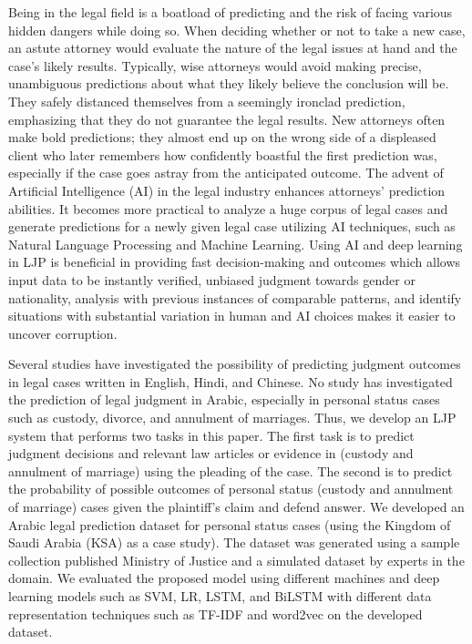 \documentclass[sn-mathphys,Numbered]{sn-jnl}%
\theoremstyle{thmstyleone}%
\theoremstyle{thmstyletwo}%
\theoremstyle{thmstylethree}%
\begin{document}
Being in the legal field is a boatload of predicting and the risk of facing various hidden dangers while doing so. When deciding whether or not to take a new case, an astute attorney would evaluate the nature of the legal issues at hand and the case's likely results. Typically, wise attorneys would avoid making precise, unambiguous predictions about what they likely believe the conclusion will be. They safely distanced themselves from a seemingly ironclad prediction, emphasizing that they do not guarantee the legal results. New attorneys often make bold predictions; they almost end up on the wrong side of a displeased client who later remembers how confidently boastful the first prediction was, especially if the case goes astray from the anticipated outcome. The advent of Artificial Intelligence (AI) in the legal industry enhances attorneys' prediction abilities. It becomes more practical to analyze a huge corpus of legal cases and generate predictions for a newly given legal case utilizing AI techniques, such as Natural Language Processing and Machine Learning. Using AI and deep learning in LJP is beneficial in providing fast decision-making and outcomes which allows input data to be instantly verified, unbiased judgment towards gender or nationality, analysis with previous instances of comparable patterns, and identify situations with substantial variation in human and AI choices makes it easier to uncover corruption. 

Several studies have investigated the possibility of predicting judgment outcomes in legal cases written in English, Hindi, and Chinese. No study has investigated the prediction of legal judgment in Arabic,  especially in personal status cases such as custody, divorce, and annulment of marriages. Thus, we develop an LJP system that performs two tasks in this paper. The first task is to predict judgment decisions and relevant law articles or evidence in (custody and annulment of marriage) using the pleading of the case. The second is to predict the probability of possible outcomes of personal status (custody and annulment of marriage) cases given the plaintiff's claim and defend answer. We developed an Arabic legal prediction dataset for personal status cases (using the Kingdom of Saudi Arabia (KSA) as a case study). The dataset was generated using a sample collection published Ministry of Justice and a simulated dataset by experts in the domain. We evaluated the proposed model using different machines and deep learning models such as SVM, LR, LSTM, and BiLSTM with different data representation techniques such as TF-IDF and word2vec on the developed dataset. %
\end{document}
